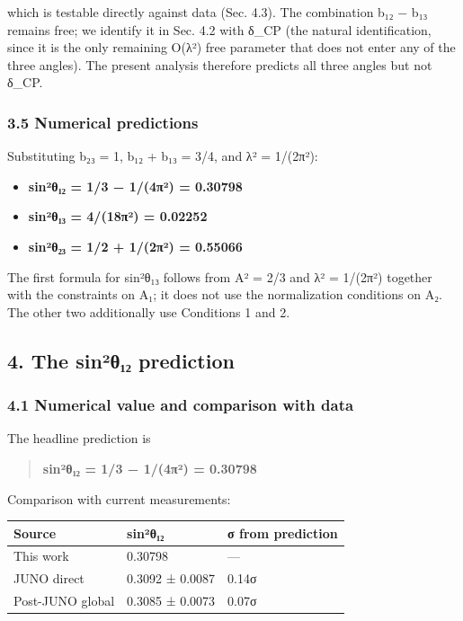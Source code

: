 \documentclass[
  11pt,
  letterpaper,
]{article}
\providecommand{\tightlist}{%
  \setlength{\itemsep}{0pt}\setlength{\parskip}{0pt}}
\begin{document}
which is testable directly against data (Sec. 4.3). The combination b₁₂
− b₁₃ remains free; we identify it in Sec. 4.2 with δ\_CP (the natural
identification, since it is the only remaining O(λ²) free parameter that
does not enter any of the three angles). The present analysis therefore
predicts all three angles but not δ\_CP.

\hypertarget{numerical-predictions}{%
\subsubsection{3.5 Numerical predictions}\label{numerical-predictions}}

Substituting b₂₃ = 1, b₁₂ + b₁₃ = 3/4, and λ² = 1/(2π²):

\begin{itemize}
\tightlist
\item
  \textbf{sin²θ₁₂ = 1/3 − 1/(4π²) = 0.30798}
\item
  \textbf{sin²θ₁₃ = 4/(18π²) = 0.02252}
\item
  \textbf{sin²θ₂₃ = 1/2 + 1/(2π²) = 0.55066}
\end{itemize}

The first formula for sin²θ₁₃ follows from A² = 2/3 and λ² = 1/(2π²)
together with the constraints on A₁; it does not use the normalization
conditions on A₂. The other two additionally use Conditions 1 and 2.

\hypertarget{the-sinuxb2ux3b8ux2081ux2082-prediction}{%
\subsection{4. The sin²θ₁₂
prediction}\label{the-sinuxb2ux3b8ux2081ux2082-prediction}}

\hypertarget{numerical-value-and-comparison-with-data}{%
\subsubsection{4.1 Numerical value and comparison with
data}\label{numerical-value-and-comparison-with-data}}

The headline prediction is

\begin{quote}
\textbf{sin²θ₁₂ = 1/3 − 1/(4π²) = 0.30798}
\end{quote}

Comparison with current measurements:

\begin{longtable}[]{@{}lll@{}}
\toprule\noalign{}
Source & sin²θ₁₂ & σ from prediction \\
\midrule\noalign{}
\endhead
\bottomrule\noalign{}
\endlastfoot
This work & 0.30798 & --- \\
JUNO direct & 0.3092 ± 0.0087 & 0.14σ \\
Post-JUNO global & 0.3085 ± 0.0073 & 0.07σ \\
\end{longtable}
\end{document}
